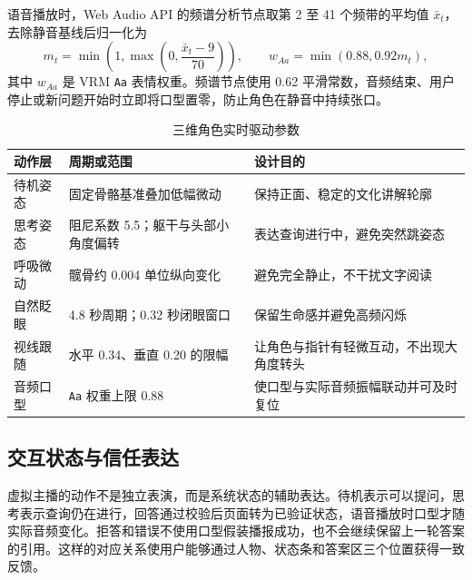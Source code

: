 \documentclass[UTF8,zihao=-4,fontset=none,twoside]{ctexart}
\newcommand{\code}[1]{\mbox{\texttt{#1}}\nobreak}
\begin{document}
语音播放时，Web Audio API 的频谱分析节点取第 2 至 41 个频带的平均值 $\bar{x}_t$，去除静音基线后归一化为
\begin{equation}
  m_t=\min\left(1,\max\left(0,\frac{\bar{x}_t-9}{70}\right)\right),
  \qquad w_{Aa}=\min(0.88,0.92m_t),
  \label{eq:mouth}
\end{equation}
其中 $w_{Aa}$ 是 VRM \code{Aa} 表情权重。频谱节点使用 0.62 平滑常数，音频结束、用户停止或新问题开始时立即将口型置零，防止角色在静音中持续张口。

\begin{table}[htbp]
\centering
\caption{三维角色实时驱动参数}
\label{tab:avatar-motion}
\begin{tabularx}{\linewidth}{@{}P{31mm}P{37mm}Y@{}}
\toprule
动作层 & 周期或范围 & 设计目的 \\
\midrule
待机姿态 & 固定骨骼基准叠加低幅微动 & 保持正面、稳定的文化讲解轮廓 \\
思考姿态 & 阻尼系数 5.5；躯干与头部小角度偏转 & 表达查询进行中，避免突然跳姿态 \\
呼吸微动 & 髋骨约 0.004 单位纵向变化 & 避免完全静止，不干扰文字阅读 \\
自然眨眼 & 4.8 秒周期；0.32 秒闭眼窗口 & 保留生命感并避免高频闪烁 \\
视线跟随 & 水平 0.34、垂直 0.20 的限幅 & 让角色与指针有轻微互动，不出现大角度转头 \\
音频口型 & \code{Aa} 权重上限 0.88 & 使口型与实际音频振幅联动并可及时复位 \\
\bottomrule
\end{tabularx}
\end{table}

\subsection{交互状态与信任表达}

虚拟主播的动作不是独立表演，而是系统状态的辅助表达。待机表示可以提问，思考表示查询仍在进行，回答通过校验后页面转为已验证状态，语音播放时口型才随实际音频变化。拒答和错误不使用口型假装播报成功，也不会继续保留上一轮答案的引用。这样的对应关系使用户能够通过人物、状态条和答案区三个位置获得一致反馈。
\end{document}
